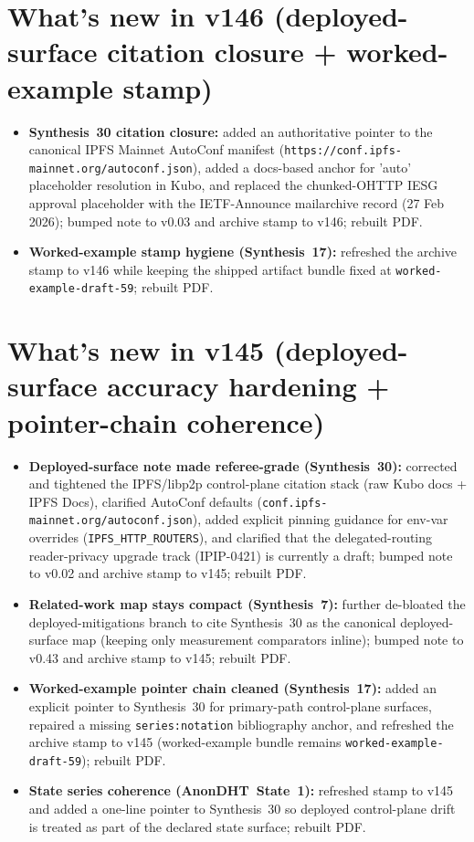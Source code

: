 \documentclass[11pt]{article}
\begin{document}
\section{What's new in v146 (deployed-surface citation closure + worked-example stamp)}
\begin{itemize}[leftmargin=*]
\item \textbf{Synthesis~30 citation closure:} added an authoritative pointer to the canonical IPFS Mainnet AutoConf manifest (\texttt{https://conf.ipfs-mainnet.org/autoconf.json}), added a docs-based anchor for 'auto' placeholder resolution in Kubo, and replaced the chunked-OHTTP IESG approval placeholder with the IETF-Announce mailarchive record (27 Feb 2026); bumped note to v0.03 and archive stamp to v146; rebuilt PDF.
\item \textbf{Worked-example stamp hygiene (Synthesis~17):} refreshed the archive stamp to v146 while keeping the shipped artifact bundle fixed at \texttt{worked-example-draft-59}; rebuilt PDF.
\end{itemize}

\section{What's new in v145 (deployed-surface accuracy hardening + pointer-chain coherence)}
\begin{itemize}[leftmargin=*]
\item \textbf{Deployed-surface note made referee-grade (Synthesis~30):} corrected and tightened the IPFS/libp2p control-plane citation stack (raw Kubo docs + IPFS Docs), clarified AutoConf defaults (\texttt{conf.ipfs-mainnet.org/autoconf.json}), added explicit pinning guidance for env-var overrides (\texttt{IPFS\_HTTP\_ROUTERS}), and clarified that the delegated-routing reader-privacy upgrade track (IPIP-0421) is currently a draft; bumped note to v0.02 and archive stamp to v145; rebuilt PDF.
\item \textbf{Related-work map stays compact (Synthesis~7):} further de-bloated the deployed-mitigations branch to cite Synthesis~30 as the canonical deployed-surface map (keeping only measurement comparators inline); bumped note to v0.43 and archive stamp to v145; rebuilt PDF.
\item \textbf{Worked-example pointer chain cleaned (Synthesis~17):} added an explicit pointer to Synthesis~30 for primary-path control-plane surfaces, repaired a missing \texttt{series:notation} bibliography anchor, and refreshed the archive stamp to v145 (worked-example bundle remains \texttt{worked-example-draft-59}); rebuilt PDF.
\item \textbf{State series coherence (AnonDHT~State~1):} refreshed stamp to v145 and added a one-line pointer to Synthesis~30 so deployed control-plane drift is treated as part of the declared state surface; rebuilt PDF.
\end{itemize}
\end{document}
